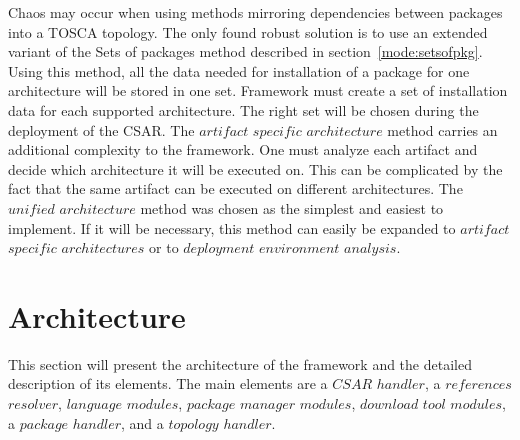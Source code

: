 Chaos may occur when using methods mirroring dependencies between packages into a TOSCA topology.
The only found robust solution is to use an extended variant of the Sets of packages method described in section~\ref{mode:setsofpkg}. 
Using this method, all the data needed for installation of a package for one architecture will be stored in one set.
Framework must create a set of installation data for each supported architecture. 
The right set will be chosen during the deployment of the CSAR. %
The $artifact$ $specific$ $architecture$ method carries an additional complexity to the framework.
One must analyze each artifact and decide which architecture it will be executed on. 
This can be complicated by the fact that the same artifact can be executed on different architectures. %
The $unified$ $architecture$ method was chosen as the simplest and easiest to implement.
If it will be necessary, this method can easily be expanded to $artifact$ $specific$ $architectures$ or to $deployment$ $environment$ $analysis$.

%



\section{Architecture}\label{sec:arch}
This section will present the architecture of the framework and the detailed description of its elements.
The main elements are a \boldmath $CSAR$ $handler$, a $references$ $resolver$, $language$ $modules$, $package$ $manager$ $modules$, $download$ $tool$ $modules$, a $package$ $handler$, and a $topology$ $handler$. \unboldmath

